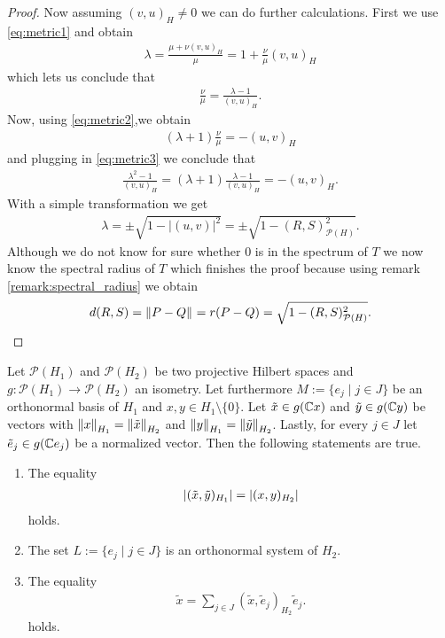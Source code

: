 \begin{proof}
	Now assuming $(v,u)_H \neq 0$ we can do further calculations. First we use \eqref{eq:metric1} and obtain
	\begin{align*}
		\lambda = \frac{\mu + \nu (v,u)_H}{\mu} = 1 + \frac{\nu}{\mu} (v,u)_H 
	\end{align*}
	which lets us conclude that 
	\begin{align}
		\frac{\nu}{\mu} = \frac{\lambda - 1}{(v,u)_H}. \label{eq:metric3}
	\end{align}
	Now, using \eqref{eq:metric2},we obtain
	\begin{align*}
		 (\lambda + 1) \frac{\nu}{\mu} =  -(u,v)_H 
	\end{align*}
	and plugging in \eqref{eq:metric3} we conclude that
	\begin{align*}
			\frac{\lambda^2 - 1}{(v,u)_H} = (\lambda + 1) \frac{\lambda - 1}{(v,u)_H} =  - (u,v)_H.
	\end{align*}
	With a simple transformation we get
	\begin{align*}
		\lambda = \pm \sqrt{1 - |(u,v)|^2} = \pm \sqrt{1 - (R,S)_{\mathcal{P}(H)}^2}.
	\end{align*}
	Although we do not know for sure whether $0$ is in the spectrum of $T$ we now know the spectral radius of $T$ which finishes the proof because using remark \ref{remark:spectral_radius} we obtain
	\begin{align*}
		d(R,S) = \norm{P - Q} = r(P - Q) = \sqrt{1 - (R,S)_{\mathcal{P}(H)}^2}.
	\end{align*}
\end{proof}


\begin{lemma}
	Let $\mathcal{P}(H_1)$ and $\mathcal{P}(H_2)$ be two projective Hilbert spaces and $g: \mathcal{P}(H_1) \to \mathcal{P}(H_2)$ an isometry. Let furthermore $M := \{e_j \mid j \in J\}$ be an orthonormal basis of $H_1$ and $x,y \in H_1 \setminus \{0\} $. Let $\tilde{x} \in g(\C x)$ and $\tilde{y} \in g(\C y)$  be vectors with $\norm[H_1]{x} = \norm[H_2]{\tilde{x}}$ and $\norm[H_1]{y} = \norm[H_2]{\tilde{y}}$. Lastly, for every $j \in J$ let $\tilde{e}_j \in g(\C e_j)$ be a normalized vector. Then the  following statements are true.
	
	\begin{enumerate}
		\item The equality
		\begin{align} 
			\vbraces{(\tilde{x}, \tilde{y})_{H_1}} = \vbraces{(x, y)_{H_2}} \label{eq:vector_isometry}
		\end{align}
		holds.		
		
		\item The set $L:=\{e_j \mid j \in J\}$ is an orthonormal system of $H_2$.
		
		\item The equality
		\begin{align}
			\tilde{x} = \sum_{j \in J} (\tilde{x}, \tilde{e}_j)_{H_2} \tilde{e}_j. \label{eq:ran_fourier}
		\end{align}
		holds.
		
	\end{enumerate} 
\end{lemma}

